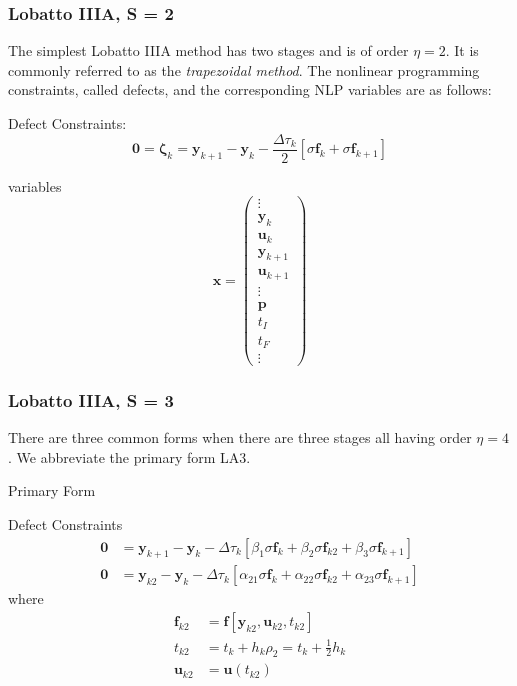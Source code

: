 \documentclass[]{article}
\begin{document}
\subsubsection{Lobatto IIIA, S = 2}
The simplest Lobatto IIIA method has two stages and is of order $\eta = 2$. It is commonly referred to as the \textit{trapezoidal method}. The nonlinear programming constraints, called defects, and the corresponding NLP variables are as follows: \vspace{2mm}

\noindent Defect Constraints:
\begin{equation}
    \mathbf{0} = \boldsymbol{\zeta}_k = \mathbf{y}_{k+1} - \mathbf{y}_k - \frac{\Delta \tau_k}{2}\left[\sigma \mathbf{f}_k + \sigma \mathbf{f}_{k+1}\right]
\end{equation}
\vspace{2mm}

\noindent variables
\begin{equation}
    \mathbf{x} = \begin{pmatrix}
        \vdots \\ \mathbf{y}_k \\ \mathbf{u}_k \\ \mathbf{y}_{k+1} \\ \mathbf{u}_{k+1} \\ \vdots \\ \mathbf{p} \\ t_I \\ t_F \\ \vdots
    \end{pmatrix}
\end{equation}

\subsubsection{Lobatto IIIA, S = 3}
There are three common forms when there are three stages all having order $\eta = 4$. We abbreviate the primary form LA3. \vspace{2mm}

\noindent Primary Form 

\noindent Defect Constraints
\begin{align}
    \mathbf{0} &= \mathbf{y}_{k+1} - \mathbf{y}_k - \Delta \tau_k\left[\beta_1\sigma\mathbf{f}_k + \beta_2\sigma\mathbf{f}_{k2} + \beta_3\sigma\mathbf{f}_{k+1}\right] \\
    \mathbf{0} &= \mathbf{y}_{k2} - \mathbf{y}_k - \Delta\tau_k\left[\alpha_{21}\sigma\mathbf{f}_k + \alpha_{22}\sigma\mathbf{f}_{k2} + \alpha_{23}\sigma\mathbf{f}_{k+1}\right]
\end{align}
where
\begin{align}
    \mathbf{f}_{k2} &= \mathbf{f}\left[\mathbf{y}_{k2},\mathbf{u}_{k2},t_{k2}\right] \\ 
    t_{k2} &= t_k + h_k\rho_2 = t_k + \frac{1}{2}h_k \\ 
    \mathbf{u}_{k2} &= \mathbf{u}(t_{k2})
\end{align}
\vspace{2mm}
\end{document}
